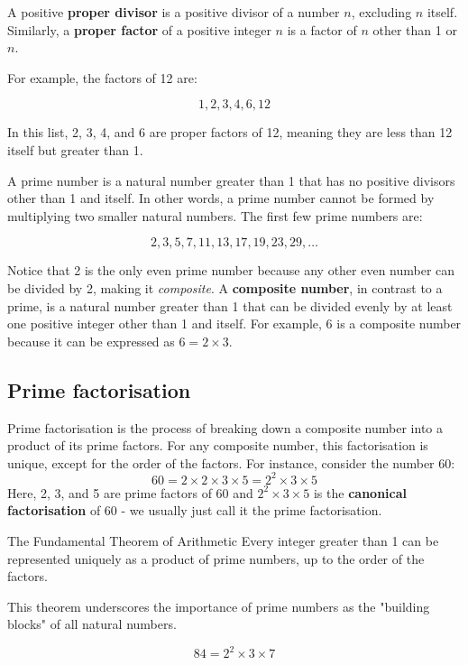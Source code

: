 A positive \textbf{proper divisor} is a positive divisor of a number \(n\), excluding \(n\) itself. Similarly, a \textbf{proper factor} of a positive integer \(n\) is a factor of \(n\) other than 1 or \(n\).

For example, the factors of 12 are:

\[
1, 2, 3, 4, 6, 12
\]

In this list, 2, 3, 4, and 6 are proper factors of 12, meaning they are less than 12 itself but greater than 1.

A prime number is a natural number greater than 1 that has no positive divisors other than 1 and itself. In other words, a prime number cannot be formed by multiplying two smaller natural numbers. The first few prime numbers are:

\[
2, 3, 5, 7, 11, 13, 17, 19, 23, 29, \ldots
\]

Notice that 2 is the only even prime number because any other even number can be divided by 2, making it \textit{composite}. A \textbf{composite number}, in contrast to a prime, is a natural number greater than 1 that can be divided evenly by at least one positive integer other than 1 and itself. For example, 6 is a composite number because it can be expressed as \(6 = 2 \times 3\).

\subsection*{Prime factorisation}
Prime factorisation is the process of breaking down a composite number into a product of its prime factors. For any composite number, this factorisation is unique, except for the order of the factors. For instance, consider the number 60:
\[
60 = 2 \times 2 \times 3 \times 5 = 2^2 \times 3 \times 5
\]
Here, 2, 3, and 5 are prime factors of 60 and $2^2 \times 3 \times 5$ is the \textbf{canonical factorisation} of 60 - we usually just call it the prime factorisation.

\begin{theorem}{The Fundamental Theorem of Arithmetic}
Every integer greater than 1 can be represented uniquely as a product of prime numbers, up to the order of the factors.
\end{theorem}

This theorem underscores the importance of prime numbers as the "building blocks" of all natural numbers.

\begin{example}

\[
84 = 2^2 \times 3 \times 7
\]
\end{example}

